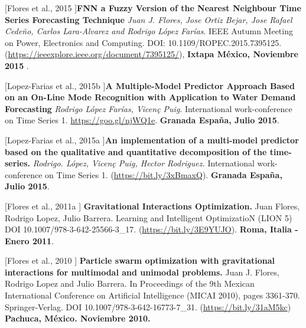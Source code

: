 \begin{innerlist}
\item [[Flores et al., 2015]]\textbf{FNN a Fuzzy Version of the Nearest Neighbour Time Series Forecasting Technique } \textit{Juan J. Flores, Jose Ortiz Bejar, Jose Rafael Cedeño, Carlos Lara-Alvarez and Rodrigo López Farías}. {IEEE Autumn Meeting on Power, Electronics and Computing}. DOI: 10.1109/ROPEC.2015.7395125. (\url{https://ieeexplore.ieee.org/document/7395125/}), \textbf{Ixtapa México, Noviembre 2015 }.

\item [[Lopez-Farias et al., 2015b]]\textbf{A Multiple-Model Predictor Approach Based on an On-Line Mode Recognition with Application to Water Demand Forecasting} \textit{Rodrigo López Farías, Vicen\c{c} Puig}.  {International work-conference on Time Series 1. 
} \url{https://goo.gl/njWQ1e}. \textbf{Granada España, Julio 2015}.

\item [[Lopez-Farias et al., 2015a]]\textbf{An implementation of a multi-model predictor based on the qualitative and quantitative decomposition of the time-series.} \textit{Rodrigo. López, Vicen\c{c} Puig, Hector Rodriguez.}  {International work-conference on Time Series 1. (\url{https://bit.ly/3xBmaxQ}). 
} \textbf{Granada España, Julio 2015}.


\item [[Flores et al., 2011a]] \textbf{Gravitational Interactions Optimization.} Juan Flores, Rodrigo Lopez, Julio Barrera. {Learning and Intelligent OptimizatioN}  (LION 5) DOI 10.1007/978-3-642-25566-3\_17. (\url{https://bit.ly/3E9YUJO}). \textbf{Roma, Italia - Enero 2011}. 

\item [[Flores et al., 2010]] \textbf{Particle swarm optimization with gravitational interactions for multimodal and unimodal problems.} Juan J. Flores, Rodrigo Lopez and Julio Barrera.  In {Proceedings of the 9th Mexican International Conference on Artificial Intelligence (MICAI 2010)}, pages 3361-370. Springer-Verlag. DOI 10.1007/978-3-642-16773-7\_31. (\url{https://bit.ly/31aM5kc}) \textbf{Pachuca, México. Noviembre 2010.}

\end{innerlist}
